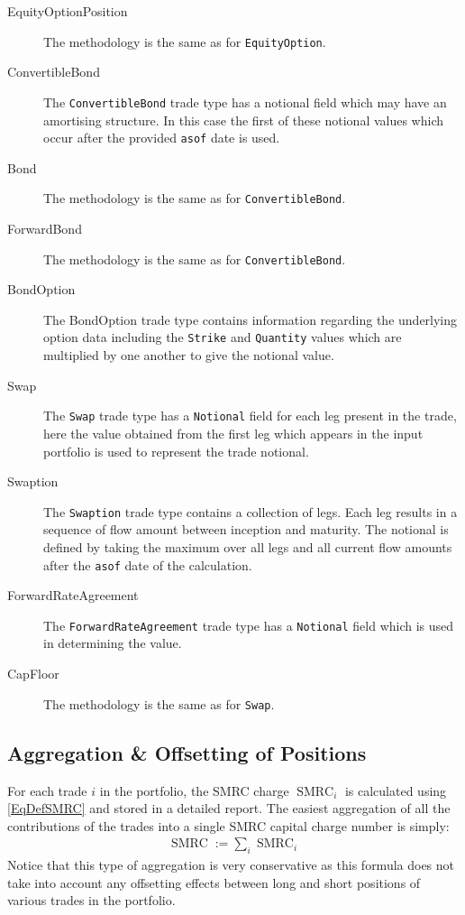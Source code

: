 \begin{description}
	\item[EquityOptionPosition] The methodology is the same as for \texttt{EquityOption}.
	\item[ConvertibleBond] The \texttt{ConvertibleBond} trade type has a notional field which may have an amortising structure. In this case the first of these notional values which occur after the provided \texttt{asof} date is used.
	\item[Bond] The methodology is the same as for \texttt{ConvertibleBond}.
	\item[ForwardBond] The methodology is the same as for \texttt{ConvertibleBond}.
	\item[BondOption] The BondOption trade type contains information regarding the underlying option data including the \texttt{Strike} and \texttt{Quantity} values which are multiplied by one another to give the notional value.
	\item[Swap] The \texttt{Swap} trade type has a \texttt{Notional} field for each leg present in the trade, here the value obtained from the first leg which appears in the input portfolio is used to represent the trade notional.
	\item[Swaption] The \texttt{Swaption} trade type contains a collection of legs. Each leg results in a sequence of flow amount between inception and maturity. The notional is defined by taking the maximum over all legs and all current flow amounts after the \texttt{asof} date of the calculation.
	\item[ForwardRateAgreement] The \texttt{ForwardRateAgreement} trade type has a \texttt{Notional} field which is used in determining the value. 
	\item[CapFloor] The methodology is the same as for \texttt{Swap}.
\end{description}

\subsection{Aggregation \& Offsetting of Positions}
For each trade $i$ in the portfolio, the SMRC charge $\operatorname{SMRC}_i$ is calculated using \eqref{EqDefSMRC} and stored in a detailed report. The easiest aggregation of all the contributions of the trades into a single SMRC capital charge number is simply:
\begin{align}
	\operatorname{SMRC} := \sum_{i}{\operatorname{SMRC}_i}
\end{align}
Notice that this type of aggregation is very conservative as this formula does not take into account any offsetting effects between long and short positions of various trades in the portfolio. 

